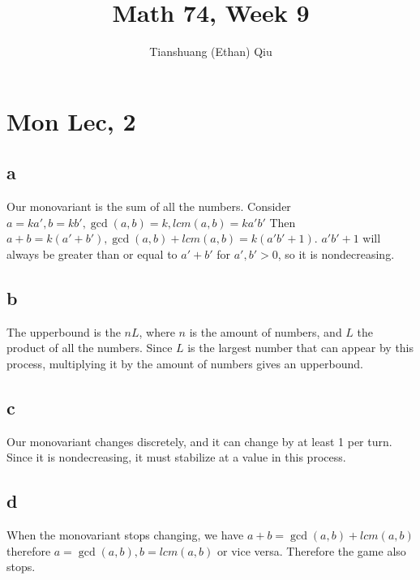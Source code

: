 \documentclass[12pt]{article}
\author{Tianshuang (Ethan) Qiu}
\begin{document}
\title{Math 74, Week 9}
\maketitle

\section{Mon Lec, 2}

\subsection{a}
Our monovariant is the sum of all the numbers. Consider $a = ka', b = kb', \gcd(a,b) = k, lcm(a,b) = ka'b'$ Then $a+b = k(a'+b'), \gcd(a,b) +lcm(a,b) = k(a'b'+1)$. $a'b' + 1$ will always be greater than or equal to $a' + b'$ for $a', b' > 0$, so it is nondecreasing.

\subsection{b}
The upperbound is the $nL$, where $n$ is the amount of numbers, and $L$ the product of all the numbers. Since $L$ is the largest number that can appear by this process, multiplying it by the amount of numbers gives an upperbound.

\subsection{c}
Our monovariant changes discretely, and it can change by at least 1 per turn. Since it is nondecreasing, it must stabilize at a value in this process.

\subsection{d}
When the monovariant stops changing, we have $a+b = \gcd(a,b) +lcm(a,b)$ therefore $a = \gcd(a,b), b = lcm(a,b)$ or vice versa. Therefore the game also stops.
\end{document}

